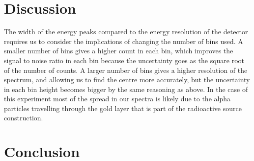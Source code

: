 \documentclass[a4paper]{article}
\newenvironment{Figure}
    {\par\medskip\noindent\minipage{\linewidth}}
    {\endminipage\par\medskip}
\begin{document}
\begin{multicols}{2}



\section{Discussion}
The width of the energy peaks compared to the energy resolution of the detector requires us to consider the implications of changing the number of bins used.
A smaller number of bins gives a higher count in each bin, which improves the signal to noise ratio in each bin because the uncertainty goes as the square root of the number of counts.
A larger number of bins gives a higher resolution of the spectrum, and allowing us to find the centre more accurately, but the uncertainty in each bin height becomes bigger by the same reasoning as above.\cite{feedback}
In the case of this experiment most of the spread in our spectra is likely due to the alpha particles travelling  through the gold layer that is part of the radioactive source construction. 


\section{Conclusion}



\end{multicols}


\end{document}
